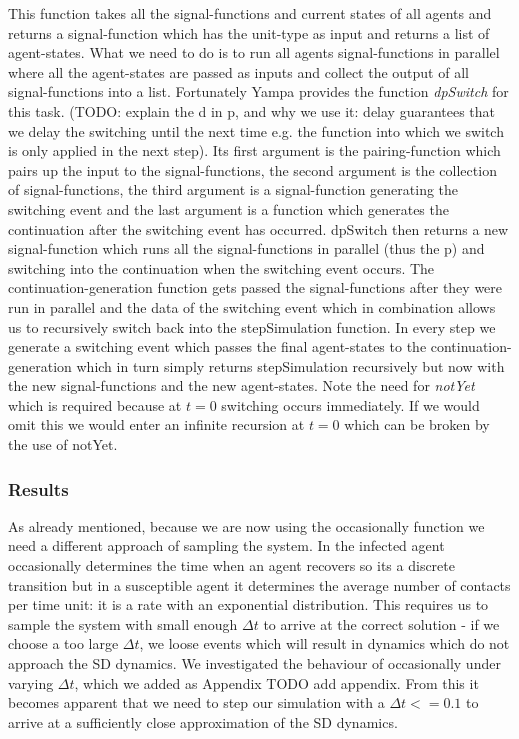 This function takes all the signal-functions and current states of all agents and returns a signal-function which has the unit-type as input and returns a list of agent-states. What we need to do is to run all agents signal-functions in parallel where all the agent-states are passed as inputs and collect the output of all signal-functions into a list. Fortunately Yampa provides the function \textit{dpSwitch} for this task. (TODO: explain the d in p, and why we use it: delay guarantees that we delay the switching until the next time e.g. the function into which we switch is only applied in the next step). Its first argument is the pairing-function which pairs up the input to the signal-functions, the second argument is the collection of signal-functions, the third argument is a signal-function generating the switching event and the last argument is a function which generates the continuation after the switching event has occurred.
dpSwitch then returns a new signal-function which runs all the signal-functions in parallel (thus the p) and switching into the continuation when the switching event occurs. The continuation-generation function gets passed the signal-functions after they were run in parallel and the data of the switching event which in combination allows us to recursively switch back into the stepSimulation function. In every step we generate a switching event which passes the final agent-states to the continuation-generation which in turn simply returns stepSimulation recursively but now with the new signal-functions and the new agent-states. Note the need for \textit{notYet} which is required because at $t = 0$ switching occurs immediately. If we would omit this we would enter an infinite recursion at $t = 0$ which can be broken by the use of notYet. 

\subsubsection{Results}
As already mentioned, because we are now using the occasionally function we need a different approach of sampling the system. In the infected agent occasionally determines the time when an agent recovers so its a discrete transition but in a susceptible agent it determines the average number of contacts per time unit: it is a rate with an exponential distribution. This requires us to sample the system with small enough $\Delta t$ to arrive at the correct solution - if we choose a too large $\Delta t$, we loose events which will result in dynamics which do not approach the SD dynamics.
We investigated the behaviour of occasionally under varying $\Delta t$, which we added as Appendix TODO add appendix. From this it becomes apparent that we need to step our simulation with a $\Delta t <= 0.1$ to arrive at a sufficiently close approximation of the SD dynamics.

